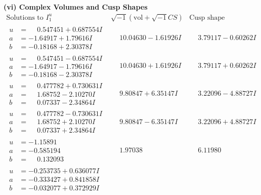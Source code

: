 \documentclass[1p]{elsarticle_modified}
\theoremstyle{definition}
\newcommand{\I}{\sqrt{-1}}
\begin{document}
\newpage\flushleft \textbf{(vi) Complex Volumes and Cusp Shapes}
$$\begin{array}{c|c|c}  
\text{Solutions to }I^u_{1}& \I (\text{vol} + \sqrt{-1}CS) & \text{Cusp shape}\\
 \hline 
\begin{aligned}
u &= \phantom{-}0.547451 + 0.687554 I \\
a &= -1.64917 + 1.79616 I \\
b &= -0.18168 + 2.30378 I\end{aligned}
 & \phantom{-}10.04630 - 1.61926 I & \phantom{-}3.79117 - 0.60262 I \\ \hline\begin{aligned}
u &= \phantom{-}0.547451 - 0.687554 I \\
a &= -1.64917 - 1.79616 I \\
b &= -0.18168 - 2.30378 I\end{aligned}
 & \phantom{-}10.04630 + 1.61926 I & \phantom{-}3.79117 + 0.60262 I \\ \hline\begin{aligned}
u &= \phantom{-}0.477782 + 0.730631 I \\
a &= \phantom{-}1.68752 - 2.10270 I \\
b &= \phantom{-}0.07337 - 2.34864 I\end{aligned}
 & \phantom{-}9.80847 + 6.35147 I & \phantom{-}3.22096 - 4.88727 I \\ \hline\begin{aligned}
u &= \phantom{-}0.477782 - 0.730631 I \\
a &= \phantom{-}1.68752 + 2.10270 I \\
b &= \phantom{-}0.07337 + 2.34864 I\end{aligned}
 & \phantom{-}9.80847 - 6.35147 I & \phantom{-}3.22096 + 4.88727 I \\ \hline\begin{aligned}
u &= -1.15891\phantom{ +0.000000I} \\
a &= -0.585194\phantom{ +0.000000I} \\
b &= \phantom{-}0.132093\phantom{ +0.000000I}\end{aligned}
 & \phantom{-}1.97038\phantom{ +0.000000I} & \phantom{-}6.11980\phantom{ +0.000000I} \\ \hline\begin{aligned}
u &= -0.253735 + 0.636077 I \\
a &= -0.333427 + 0.841858 I \\
b &= -0.032077 + 0.372929 I\end{aligned}

\end{array}$$
\end{document}
